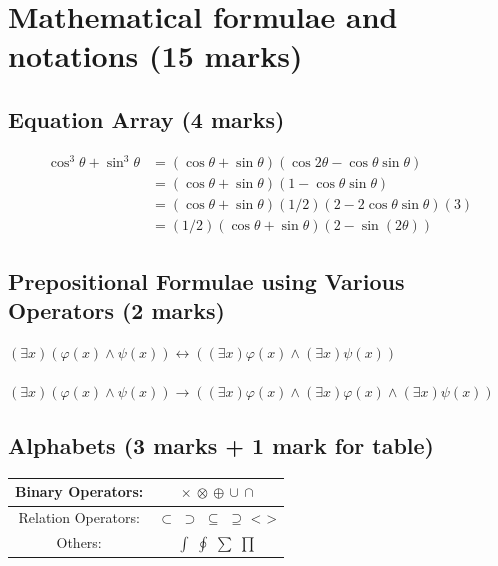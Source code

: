 \documentclass{article}
\begin{document}
\section{Mathematical formulae and notations (15 marks)}
\subsection{Equation Array (4 marks)}
\begin{align}
 \cos^3\theta+\sin^3\theta &= (\cos\theta+\sin\theta)(\cos2\theta-\cos\theta\sin\theta)\\
&=(\cos\theta+\sin\theta)(1-\cos\theta\sin\theta)\\&=
(\cos\theta+\sin\theta)(1/2)(2-2\cos\theta\sin\theta)(3)\\
&= (1/2)(\cos\theta+\sin\theta)(2-\sin(2\theta))
\end{align}
\subsection{Prepositional Formulae using Various Operators (2 marks)}\vspace*{0.5cm}
$(\exists x)(\varphi(x)\wedge\psi(x))\leftrightarrow((\exists x)\varphi(x)\wedge(\exists x)\psi(x))$\\ \\
$(\exists x)(\varphi(x)\wedge\psi(x))\rightarrow((\exists x)\varphi(x)\wedge(\exists x)\varphi(x)\wedge(\exists x)\psi(x))$ 
\subsection{Alphabets (3 marks + 1 mark for table)}
\begin{center}
    \begin{tabular}{|c|c|}
    \hline
    Binary Operators: & $\times$ $\otimes$  $\oplus$ $\cup$ $\cap$ \\[3ex]
    \hline
    Relation Operators: & $\subset$ $\supset$ $\subseteq$ $\supseteq$ < > \\[3ex]
    \hline
    Others: & $\int$ $\oint$ $\sum$ $\prod$ \\[3ex] 
    \hline
    \end{tabular}
\end{center}
\end{document}
